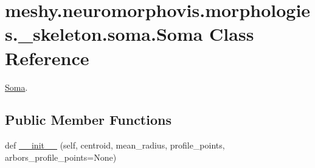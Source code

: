 \hypertarget{classmeshy_1_1neuromorphovis_1_1morphologies_1_1__skeleton_1_1soma_1_1Soma}{}\section{meshy.\+neuromorphovis.\+morphologies.\+\_\+skeleton.\+soma.\+Soma Class Reference}
\label{classmeshy_1_1neuromorphovis_1_1morphologies_1_1__skeleton_1_1soma_1_1Soma}


\hyperlink{classmeshy_1_1neuromorphovis_1_1morphologies_1_1__skeleton_1_1soma_1_1Soma}{Soma}.  


\subsection*{Public Member Functions}
\begin{DoxyCompactItemize}
\item 
def \hyperlink{classmeshy_1_1neuromorphovis_1_1morphologies_1_1__skeleton_1_1soma_1_1Soma_a865f317d634a0e51c96142557fff3426}{\+\_\+\+\_\+init\+\_\+\+\_\+} (self, centroid, mean\+\_\+radius, profile\+\_\+points, arbors\+\_\+profile\+\_\+points=None)
\end{DoxyCompactItemize}
